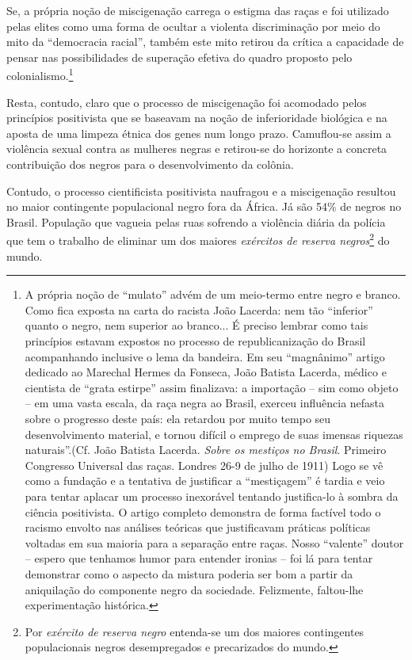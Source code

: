Se, a própria noção de miscigenação carrega o estigma das raças e foi
utilizado pelas elites como uma forma de ocultar a violenta
discriminação por meio do mito da ``democracia racial'', também este
mito retirou da crítica a capacidade de pensar nas possibilidades de
superação efetiva do quadro proposto pelo colonialismo.\footnote{A
  própria noção de ``mulato'' advém de um meio-termo entre negro e
  branco. Como fica exposta na carta do racista João Lacerda: nem tão
  ``inferior'' quanto o negro, nem superior ao branco... É preciso
  lembrar como tais princípios estavam expostos no processo de
  republicanização do Brasil acompanhando inclusive o lema da bandeira.
  Em seu ``magnânimo'' artigo dedicado ao Marechal Hermes da Fonseca,
  João Batista Lacerda, médico e cientista de ``grata estirpe'' assim
  finalizava: a importação -- sim como objeto -- em uma vasta escala, da
  raça negra ao Brasil, exerceu influência nefasta sobre o progresso
  deste país: ela retardou por muito tempo seu desenvolvimento material,
  e tornou difícil o emprego de suas imensas riquezas naturais''.(Cf.
  João Batista Lacerda. \emph{Sobre os mestiços no Brasil}. Primeiro
  Congresso Universal das raças. Londres 26-9 de julho de 1911) Logo se
  vê como a fundação e a tentativa de justificar a ``mestiçagem'' é
  tardia e veio para tentar aplacar um processo inexorável tentando
  justifica-lo à sombra da ciência positivista. O artigo completo
  demonstra de forma factível todo o racismo envolto nas análises
  teóricas que justificavam práticas políticas voltadas em sua maioria
  para a separação entre raças. Nosso ``valente'' doutor -- espero que
  tenhamos humor para entender ironias -- foi lá para tentar demonstrar
  como o aspecto da mistura poderia ser bom a partir da aniquilação do
  componente negro da sociedade. Felizmente, faltou-lhe experimentação
  histórica.}

Resta, contudo, claro que o processo de miscigenação foi acomodado pelos
princípios positivista que se baseavam na noção de inferioridade
biológica e na aposta de uma limpeza étnica dos genes num longo prazo.
Camuflou-se assim a violência sexual contra as mulheres negras e
retirou-se do horizonte a concreta contribuição dos negros para o
desenvolvimento da colônia.

Contudo, o processo cientificista positivista naufragou e a miscigenação
resultou no maior contingente populacional negro fora da África. Já são
54\% de negros no Brasil. População que vagueia pelas ruas sofrendo a
violência diária da polícia que tem o trabalho de eliminar um dos
maiores \emph{exércitos de reserva negros}\footnote{Por \emph{exército
  de reserva negro} entenda-se um dos maiores contingentes populacionais
  negros desempregados e precarizados do mundo.} do mundo.


